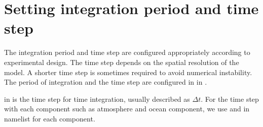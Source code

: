 \section{Setting integration period and time step} \label{sec:timeintiv}

The integration period and time step are configured appropriately according to experimental design.
The time step depends on the spatial resolution of the model.
A shorter time step is sometimes required to avoid numerical instability.
The period of integration and the time step are configured in  in \runconf.



 in  is the time step for time integration, usually described as $\Delta t$.
For the time step with each component such as atmosphere and ocean component, 
we use  and  in namelist for each component. 

